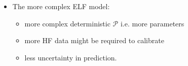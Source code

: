 \documentclass[10pt,xcolor=dvipsnames,compress]{beamer}
\begin{document}
\begin{frame}
\begin{columns}
\begin{block}{}
\begin{itemize}
\item The more complex ELF model:
\begin{itemize}
\item more complex deterministic $\mathcal{P}$ i.e. more parameters
\item more HF data might be required to calibrate 
\item less uncertainty in prediction.
\end{itemize}

\end{itemize}
\end{block}


\end{columns}


\vfill
\end{frame}


\end{document}
